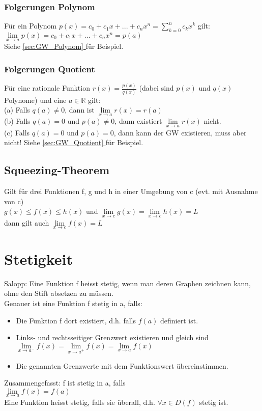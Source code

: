 \documentclass[../main.tex]{subfiles}
\begin{document}
\subsubsection{Folgerungen Polynom}
Für ein Polynom $p(x) = c_0 + c_1x + ... + c_nx^n = \sum\limits_{k=0}^n c_kx^k$ gilt: \\[7pt]
$\lim\limits_{x\to a} p(x) = c_0 + c_1x + ... + c_nx^n = p(a)$ \\ [7pt]
Siehe \hyperref[sec:GW_Polynom]{\ref{sec:GW_Polynom} } für Beispiel.

\subsubsection{Folgerungen Quotient}
Für eine rationale Funktion $r(x) = \frac{p(x)}{q(x)}$ (dabei sind $p(x)$ und $q(x)$ Polynome) und eine $a \in \mathbb{R}$ gilt: \\
(a) Falls $q(a) \neq 0$, dann ist $\lim\limits_{x\to a} r(x) = r(a)$ \\
(b) Falls $q(a) = 0$ und $p(a) \neq 0$, dann existiert $\lim\limits_{x\to a} r(x)$ nicht. \\
(c) Falls $q(a) = 0$ und $p(a) = 0$, dann kann der GW existieren, muss aber nicht!
Siehe \hyperref[sec:GW_Quotient]{\ref{sec:GW_Quotient} } für Beispiel.

\subsection{Squeezing-Theorem}
Gilt für drei Funktionen f, g und h in einer Umgebung von c (evt. mit Ausnahme von c) \\ [7pt]
$g(x) \le f(x) \le h(x)$ und $\lim\limits_{x\to c} g(x) = \lim\limits_{x\to c} h(x) = L$ \\ [7pt]
dann gilt auch $\lim\limits_{x\to c} f(x) = L$

\section{Stetigkeit}
Salopp: Eine Funktion f heisst stetig, wenn man deren Graphen zeichnen kann, ohne den Stift absetzen zu müssen. \\ [7pt]
Genauer ist eine Funktion f stetig in a, falls:
\begin{itemize}
    \item Die Funktion f dort existiert, d.h. falls $f(a)$ definiert ist.
    \item Links- und rechtsseitiger Grenzwert existieren und gleich sind \\ [7pt]
    $\lim\limits_{x\to a^-} f(x) = \lim\limits_{x\to a^+} f(x) = \lim\limits_{x\to a} f(x)$ 
    \item Die genannten Grenzwerte mit dem Funktionswert übereinstimmen.
\end{itemize}
Zusammengefasst: f ist stetig in a, falls \\ [7pt]
$\lim\limits_{x\to a} f(x) = f(a)$ \\ [7pt]
Eine Funktion heisst stetig, falls sie überall, d.h. $\forall x \in D(f)$ stetig ist.
\end{document}
